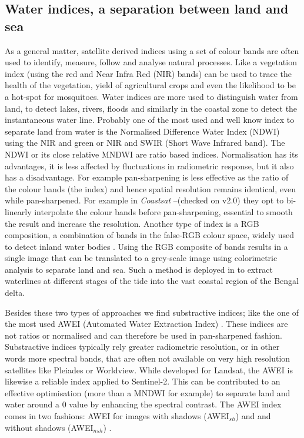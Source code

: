 \documentclass[remotesensing,article,submit,pdftex,moreauthors]{Definitions/mdpi}
\begin{document}
\subsection{Water indices, a separation between land and sea}
As a general matter, satellite derived indices using a set of colour bands are often used to identify, measure, follow and analyse natural processes. Like a vegetation index (using the red and Near Infra Red (NIR) bands) can be used to trace the health of the vegetation, yield of agricultural crops and even the likelihood to be a hot-spot for mosquitoes. Water indices are more used to distinguish water from land, to detect lakes, rivers, floods and similarly in the coastal zone to detect the instantaneous water line. Probably one of the most used and well know index to separate land from water is the Normalised Difference Water Index (NDWI) using the NIR and green or NIR and SWIR (Short Wave Infrared band). The NDWI or its close relative MNDWI are ratio based indices. Normalisation has its advantages, it is less affected by fluctuations in radiometric response, but it also has a disadvantage. For example pan-sharpening is less effective as the ratio of the colour bands (the index) and hence spatial resolution remains identical, even while pan-sharpened. For example in \textit{Coastsat} --(checked on v2.0) they opt to bi-linearly interpolate the colour bands before pan-sharpening, essential to smooth the result and increase the resolution. Another type of index is a RGB composition, a combination of bands in the false-RGB colour space, widely used to detect inland water bodies \citep{PEKEL2014704}. Using the RGB composite of bands results in a single image that can be translated to a grey-scale image using colorimetric analysis to separate land and sea. Such a method is deployed in \citet{Khan2019} to extract waterlines at different stages of the tide into the vast coastal region of the Bengal delta. 

Besides these two types of approaches we find substractive indices; like the one of the most used AWEI (Automated Water Extraction Index) \citep{FEYISA201423}. These indices are not ratios or normalised and can therefore be used in pan-sharpened fashion. Substractive indices typically rely greater radiometric resolution, or in other words more spectral bands, that are often not available on very high resolution satellites like Pleiades or Worldview. While developed for Landsat, the AWEI is likewise a reliable index applied to Sentinel-2. This can be contributed to an effective optimisation (more than a MNDWI for example) to separate land and water around a 0 value by enhancing the spectral contrast. The AWEI index comes in two fashions: AWEI for images with shadows (AWEI$_{sh}$) and and without shadows (AWEI$_{nsh}$) \citep{FEYISA201423}.
\end{document}
